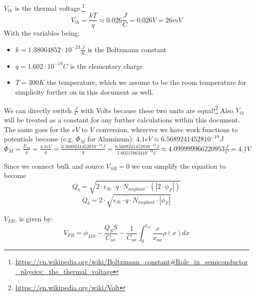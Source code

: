 $V_{th}$ is the thermal voltage.\footnote{\url{https://en.wikipedia.org/wiki/Boltzmann_constant\#Role_in_semiconductor_physics:_the_thermal_voltage}}
\begin{equation}
V_{th} = \frac{k T}{q} \approx 0.026 \frac{J}{C} = 0.026 V = 26mV
\end{equation}
With the variables being:
\begin{itemize}
\item $k=1.38064852\cdot 10^{-23}  \frac{J}{K}$ is the Boltzmann constant
\item $q=1.602 \cdot 10^{-19} C$ is the elementary charge
\item $T= 300 K$ the temperature, which we assume to be the room temperature for simplicity further on in this document as well.
\end{itemize}

\begin{mdframed}[linewidth=2pt,linecolor=red]
We can directly switch $\frac{J}{C}$ with Volts because these two units are equal!\footnote{\url{https://en.wikipedia.org/wiki/Volt}}
Also $V_{th}$ will be treated as a constant for any further calculations within this document.\\

The same goes for the $eV$ to $V$ conversion, wherever we have work functions to potentials because (e.g. $\Phi_M$ for Aluminum):
$4.1 eV \approx 6.56892414528 10^{-19}J$ \\
$\Phi_M=\frac{E_M}{q}=\frac{4.1 eV}{q}=\frac{6.56892414528 10^{-19} J}{q} = \frac{6.56892414528 10^{-19} J}{1.602176634 10^{-19} C} \approx 4.099999966220953 \frac{J}{C} = \underline{4.1V}$ \\
\end{mdframed}

Since we connect bulk and source $V_{SB}=0$ we can simplify the equation to become
\begin{equation}
Q_b
=
\sqrt{2\cdot\epsilon_{Si}\cdot q\cdot N_{implant} \cdot  ( \left| 2 \cdot \phi_F \right|) }
\end{equation}
\begin{equation}
Q_b
=
2\cdot\sqrt{\epsilon_{Si}\cdot q\cdot N_{implant}\cdot \left| \phi_F \right| }
\end{equation}


$V_{FB}$, is given by:
\begin{equation}
V_{FB}
=
\phi_{MS}-\frac{Q_SS}{C_{ox}}-\frac{1}{C_{ox}}\int_{0}^{t_{ox}}\frac{x}{x_{ox}}\rho(x) dx
\end{equation}

